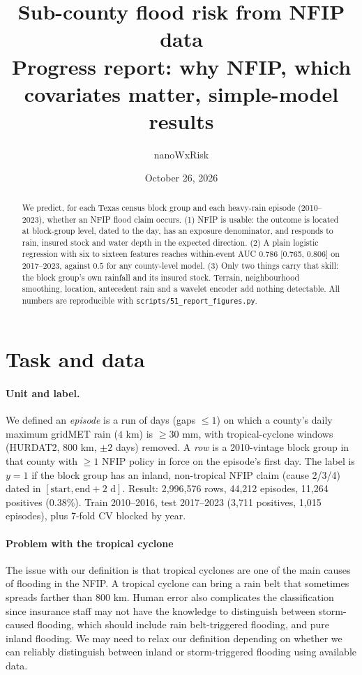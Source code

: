 \documentclass[11pt]{article}
\title{Sub-county flood risk from NFIP data\\[2pt]\large Progress report: why NFIP, which covariates matter, simple-model results}
\author{nanoWxRisk}
\date{October 26, 2026}
\newcommand{\tc}[1]{\texttt{#1}}
\begin{document}
\maketitle

\begin{abstract}\noindent
We predict, for each Texas census block group and each heavy-rain episode (2010--2023), whether an NFIP flood claim occurs.
(1) NFIP is usable: the outcome is located at block-group level, dated to the day, has an exposure denominator, and responds to rain, insured stock and water depth in the expected direction.
(2) A plain logistic regression with six to sixteen features reaches within-event AUC $0.786$ [0.765, 0.806] on 2017--2023, against $0.5$ for any county-level model.
(3) Only two things carry that skill: the block group's own rainfall and its insured stock. Terrain, neighbourhood smoothing, location, antecedent rain and a wavelet encoder add nothing detectable.
All numbers are reproducible with \tc{scripts/51\_report\_figures.py}.
\end{abstract}

\section{Task and data}

\paragraph{Unit and label.}
We defined an \emph{episode} is a run of days (gaps $\le1$) on which a county's daily maximum gridMET rain ($4$ km) is $\ge30$ mm, with tropical-cyclone windows (HURDAT2, 800 km, $\pm2$ days) removed. A \emph{row} is a 2010-vintage block group in that county with $\ge1$ NFIP policy in force on the episode's first day. The label is $y=1$ if the block group has an inland, non-tropical NFIP claim (cause 2/3/4) dated in $[\text{start},\text{end}+2\text{ d}]$.
Result: 2,996,576 rows, 44,212 episodes, 11,264 positives (0.38\%). Train 2010--2016, test 2017--2023 (3,711 positives, 1,015 episodes), plus 7-fold CV blocked by year.
\paragraph{Problem with the tropical cyclone}
The issue with our definition is that tropical cyclones are one of the main causes of flooding in the NFIP. A tropical cyclone can bring a rain belt that sometimes spreads farther than 800 km. Human error also complicates the classification since insurance staff may not have the knowledge to distinguish between storm-caused flooding, which should include rain belt-triggered flooding, and pure inland flooding. We may need to relax our definition depending on whether we can reliably distinguish between inland or storm-triggered flooding using available data.
\end{document}
